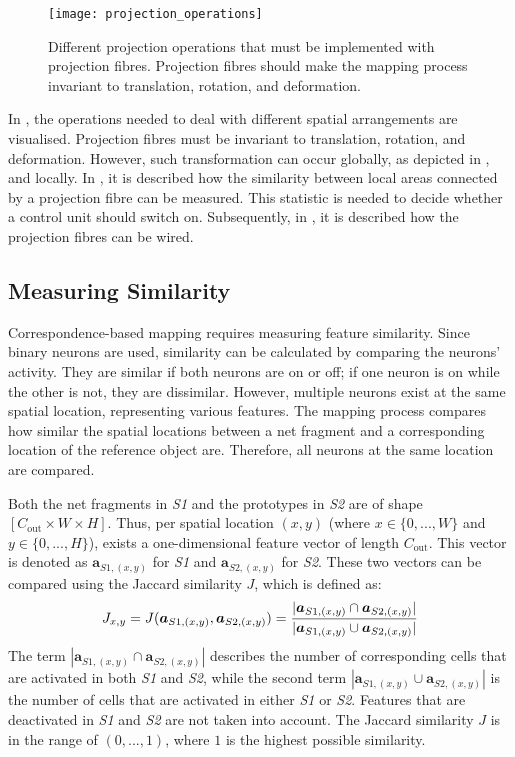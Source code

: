 \begin{figure}[h]
    \centering
    \texttt{[image: projection\_operations]}
    \caption[Different projection operation]{Different projection operations that must be implemented with projection fibres. Projection fibres should make the mapping process invariant to translation, rotation, and deformation.}
\end{figure}
In , the operations needed to deal with different spatial arrangements are visualised.
Projection fibres must be invariant to translation, rotation, and deformation. However, such transformation can occur globally, as depicted in , and locally.
In , it is described how the similarity between local areas connected by a projection fibre can be measured. This statistic is needed to decide whether a control unit should switch on. Subsequently, in , it is described how the projection fibres can be wired.

\subsection{Measuring Similarity}
Correspondence-based mapping requires measuring feature similarity.
Since binary neurons are used, similarity can be calculated by comparing the neurons' activity. They are similar if both neurons are on or off; if one neuron is on while the other is not, they are dissimilar.
However, multiple neurons exist at the same spatial location, representing various features.
The mapping process compares how similar the spatial locations between a net fragment and a corresponding location of the reference object are.
Therefore, all neurons at the same location are compared.

Both the net fragments in \emph{S1} and the prototypes in \emph{S2} are of shape $[C_{\text{out}} \times W \times H]$. Thus, per spatial location $(x,y)$ (where $x \in \{0, ..., W\}$ and $y \in \{0, ..., H\}$), exists a one-dimensional feature vector of length $C_{\text{out}}$. This vector is denoted as $\boldsymbol{a}_{S1,(x,y)}$ for \emph{S1} and $\boldsymbol{a}_{S2,(x,y)}$ for \emph{S2}.
These two vectors can be compared using the Jaccard similarity $J$, which is defined as:
%
\begin{align}\eqlbl{jaccard}
	J_{x,y} = J(\boldsymbol{a}_{S1,(x,y)}, \boldsymbol{a}_{S2,(x,y)}) = \frac{|\boldsymbol{a}_{S1,(x,y)} \cap \boldsymbol{a}_{S2,(x,y)}|}{|\boldsymbol{a}_{S1,(x,y)} \cup \boldsymbol{a}_{S2,(x,y)}|}
\end{align}
%
The term $|\boldsymbol{a}_{S1,(x,y)} \cap \boldsymbol{a}_{S2,(x,y)}|$ describes the number of corresponding cells that are activated in both \emph{S1} and \emph{S2}, while the second term $|\boldsymbol{a}_{S1,(x,y)} \cup \boldsymbol{a}_{S2,(x,y)}|$ is the number of cells that are activated in either \emph{S1} or \emph{S2}. Features that are deactivated in \emph{S1} and \emph{S2} are not taken into account.
The Jaccard similarity $J$ is in the range of $(0, ..., 1)$, where $1$ is the highest possible similarity.

